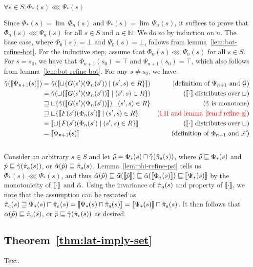 \begin{lemma} \label{lem:phi-refine-psi}
$\forall s \in S : \Phi_{*}(s) \lll \Psi_{*}(s)$
\end{lemma}

Since $\Phi_{*}(s) = \lim \, \Phi_{n}(s)$ and $\Psi_{*}(s) = \lim \, \Psi_{n}(s)$, it suffices to prove that $\Phi_{n}(s) \lll \Psi_{n}(s)$ for all $s \in S$ and $n \in \mathbb{N}$. We do so by induction on $n$. The base case, where $\Phi_{0}(s) = \bot$ and $\Psi_{0}(s) = \bot$, follows from lemma~\ref{lem:bot-refine-bot}. For the inductive step, assume that $\Phi_{n}(s) \lll \Psi_{n}(s)$ for all $s \in S$. For $s = s_{0}$, we have that $\Phi_{n+1}(s_{0}) = \top$ and $\Psi_{n+1}(s_{0}) = \top$, which also follows from lemma~\ref{lem:bot-refine-bot}. For any $s \neq s_{0}$, we have:
%
\begin{align*}
\hat{\gamma}(\llbracket \Psi_{n+1}(s) \rrbracket)
  & =         \hat{\gamma}(\llbracket \sqcup \{ G(s')(\Psi_{n}(s')) \mid (s',s) \in R \} \rrbracket) & (\textrm{definition of } \Psi_{n+1} \textrm { and } \mathcal{G}) \\
  & =         \hat{\gamma}(\sqcup \{ \llbracket G(s')(\Psi_{n}(s')) \rrbracket \mid (s',s) \in R \}) & (\llbracket \cdot \rrbracket \textrm{ distributes over } \sqcup) \\
  & \sqsupseteq \sqcup \{ \hat{\gamma}(\llbracket G(s')(\Psi_{n}(s')) \rrbracket) \mid (s',s) \in R \} & (\hat{\gamma} \textrm{ is monotone}) \\
  & \sqsupseteq \sqcup \{ \llbracket F(s')(\Phi_{n}(s') \rrbracket \mid (s',s) \in R \}           & (\textrm{\textcolor{red}{I.H and lemma~\ref{lem:f-refine-g}}}) \\
  & =         \llbracket \sqcup \{ F(s')(\Phi_{n}(s') \mid (s',s) \in R \} \rrbracket           & (\llbracket \cdot \rrbracket \textrm{ distributes over } \sqcup) \\
  & =         \llbracket \Phi_{n+1}(s) \rrbracket                                              & (\textrm{definition of } \Phi_{n+1} \textrm{ and } \mathcal{F})
\end{align*}
\\

Consider an arbitrary $s \in S$ and let $\hat p = \Phi_{*}(s) \sqcap \hat{\gamma}(\operatorname{\hat{\pi}_{\textrm{a}}}(s))$, where $\hat p \sqsubseteq \Phi_{*}(s)$ and $\hat p \sqsubseteq \hat{\gamma}(\operatorname{\hat{\pi}_{\textrm{a}}}(s))$, or $\hat{\alpha}(\hat p) \sqsubseteq \operatorname{\hat{\pi}_{\textrm{a}}}(s)$. Lemma~\ref{lem:phi-refine-psi} tells us $\Phi_{*}(s) \lll \Psi_{*}(s)$, and thus $\hat{\alpha}(\hat p) \sqsubseteq \hat{\alpha}(\llbracket \hat p \rrbracket) \sqsubseteq \hat{\alpha}(\llbracket \Phi_{*}(s) \rrbracket) \sqsubseteq \llbracket \Psi_{*}(s) \rrbracket$ by the monotonicity of $\llbracket \cdot \rrbracket$ and $\hat{\alpha}$. Using the invariance of $\operatorname{\hat{\pi}_{\textrm{a}}}(s)$ and property  of $\llbracket \cdot \rrbracket$, we note that the assumption can be restated as $\operatorname{\hat{\pi}_{\textrm{c}}}(s) \sqsupseteq \Psi_{*}(s) \sqcap \operatorname{\hat{\pi}_{\textrm{a}}}(s) = \llbracket \Psi_{*}(s) \sqcap \operatorname{\hat{\pi}_{\textrm{a}}}(s) \rrbracket = \llbracket \Psi_{*}(s) \rrbracket \sqcap \operatorname{\hat{\pi}_{\textrm{a}}}(s)$. It then follows that $\alpha(\hat p) \sqsubseteq \operatorname{\hat{\pi}_{\textrm{c}}}(s)$, or $\hat p \sqsubseteq \hat{\gamma}(\operatorname{\hat{\pi}_{\textrm{c}}}(s))$ as desired. %

\subsection{Theorem~\ref{thm:lat-imply-set}}

Text.
